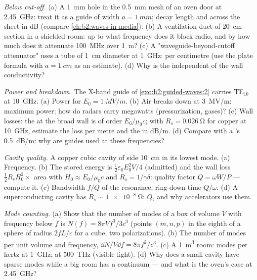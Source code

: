 \begin{exercise}[$\star\star$]\label{exo:b2:guided-waves:6}
\emph{Below cut-off.} (a) A \qty{1}{mm} hole in the \qty{0.5}{mm} mesh of an
oven door at \qty{2.45}{GHz}: treat it as a guide of width $a = \qty{1}{mm}$;
decay length and  across the sheet in dB (compare
\cref{ch:b2:waves-in-media}). (b) A ventilation duct of \qty{20}{cm}
section in a shielded room: up to what frequency does it block radio,
and by how much does it attenuate \qty{100}{MHz} over \qty{1}{m}? (c) A
"waveguide-beyond-cutoff attenuator" uses a tube of \qty{1}{cm} diameter at
\qty{1}{GHz}:  per centimetre (use the plate formula with $a =
\qty{1}{cm}$ as an estimate). (d) Why is the  independent of
the wall conductivity?
\end{exercise}

\begin{exercise}[$\star\star$]\label{exo:b2:guided-waves:7}
\emph{Power and breakdown.} The X-band guide of \cref{exo:b2:guided-waves:2}
carries TE$_{10}$ at \qty{10}{GHz}. (a) Power for $E_0 = \qty{1}{MV/m}$. (b) Air
breaks down at \qty{3}{MV/m}: maximum power; how do radars carry
megawatts (pressurization, gases)? (c) Wall losses: the 
at the broad wall is of order $E_0/\mu_0c$; with $R_s = \qty{0.026}{\ohm}$ for
copper at \qty{10}{GHz}, estimate the loss per metre and the 
in dB/m. (d) Compare with a 's \qty{0.5}{dB/m}: why are
guides used at these frequencies?
\end{exercise}

\begin{exercise}[$\star\star$]\label{exo:b2:guided-waves:8}
\emph{Cavity quality.} A copper cubic cavity of side \qty{10}{cm} in its
lowest mode. (a) Frequency. (b) The stored energy is $\tfrac12\varepsilon_0E_0^2V/4$
(admitted) and the wall loss $\tfrac12R_sH_0^2\times$ area with $H_0 \approx E_0/
\mu_0c$ and $R_s = 1/\gamma\delta$: quality factor $Q = \omega W/P$ --- compute it.
(c) Bandwidth $f/Q$ of the resonance; ring-down time $Q/\omega$. (d) A
superconducting cavity has $R_s \sim \qty{1e-8}{\ohm}$: $Q$, and why
accelerators use them.
\end{exercise}

\begin{exercise}[$\star\star$]\label{exo:b2:guided-waves:9}
\emph{Mode counting.} (a) Show that the number of modes of a box of
volume $V$ with frequency below $f$ is $N(f) = 8\pi Vf^3/3c^3$ (points
$(m, n, p)$ in the eighth of a sphere of radius $2fL/c$ for a cube, two
polarizations). (b) The number of modes per unit volume and frequency,
$\dd N/V\dd f = 8\pi f^2/c^3$. (c) A \qty{1}{m^3} room: modes per hertz at
\qty{1}{GHz}; at \qty{500}{THz} (visible light). (d) Why does a small
cavity have sparse modes while a big room has a continuum --- and what
is the oven's case at \qty{2.45}{GHz}?
\end{exercise}

